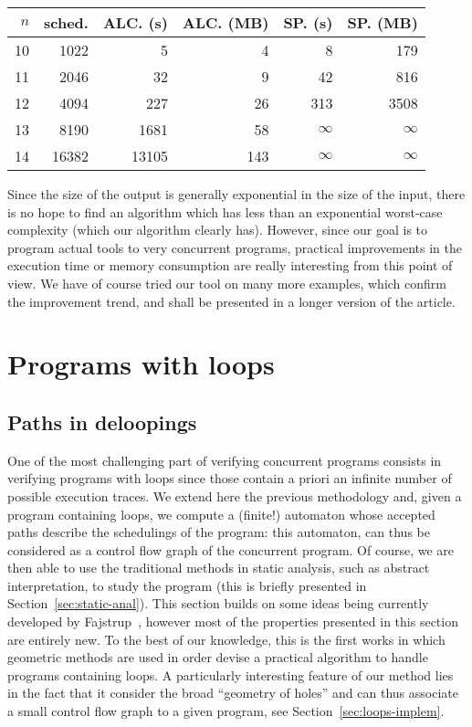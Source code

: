 \documentclass[orivec]{llncs} \usepackage[T1]{fontenc}
\begin{document}
\begin{center}
  \begin{tabular}{r|r|r|r|r|r}
    $n$&sched.& ALC. (s)&ALC. (MB)&SP. (s)&SP. (MB)\\
    \hline
10&1022&5&4&8&179\\
    11&2046&32&9&42&816\\
    12&4094&227&26&313&3508\\
    13&8190&1681&58&$\infty$&$\infty$\\
    14&16382&13105&143&$\infty$&$\infty$\\
  \end{tabular}
\end{center}



Since the size of the output is generally exponential in the size of the input,
there is no hope to find an algorithm which has less than an exponential
worst-case complexity (which our algorithm clearly has). However, since our goal
is to program actual tools to very concurrent programs, practical improvements
in the execution time or memory consumption are really interesting from this
point of view. We have of course tried our tool on many more examples, which
confirm the improvement trend, and shall be presented in a longer version of the
article.





\section{Programs with loops}
\label{programswithloops}
\subsection{Paths in deloopings}
One of the most challenging part of verifying concurrent programs consists in
verifying programs with loops since those contain a priori an infinite number of
possible execution traces. We extend here the previous methodology and, given a
program containing loops, we compute a (finite!) automaton whose accepted paths
describe the schedulings of the program: this automaton, can thus be considered
as a control flow graph of the concurrent program. Of course, we are then able
to use the traditional methods in static analysis, such as abstract
interpretation, to study the program (this is briefly presented in
Section~\ref{sec:static-anal}). This section builds on some ideas being
currently developed by Fajstrup~\cite{LF2011}, however most of the properties
presented in this section are entirely new. To the best of our knowledge, this
is the first works in which geometric methods are used in order devise a
practical algorithm to handle programs containing loops. A particularly
interesting feature of our method lies in the fact that it consider the broad
``geometry of holes'' and can thus associate a small control flow graph to a
given program, see Section~\ref{sec:loops-implem}.
\end{document}
